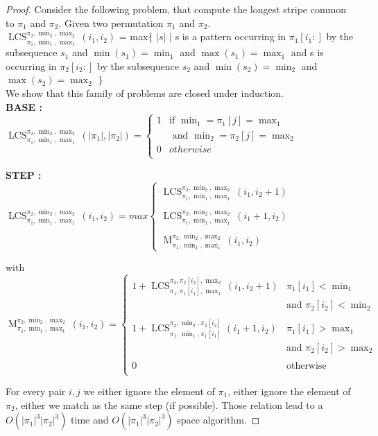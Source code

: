 \documentclass[a4paper]{llncs}
\DeclareMathOperator{\LCSa}{LCS}
\newcommand{\LCS}[8]{\LCSa_{{#1},{#2},{#3}}^{{#4},{#5},{#6}}({#7},{#8})}
\DeclareMathOperator{\matcha}{M}
\newcommand{\match}[8]{\matcha_{{#1},{#2},{#3}}^{{#4},{#5},{#6}}({#7},{#8})}
\begin{document}
\begin{proof}
Consider the following problem,
that compute the longest stripe common to $\pi_1$ and $\pi_2$.
Given two permutation $\pi_1$ and $\pi_2$.\\

$\LCS{\pi_1}{\min_1}{\max_1}{\pi_2}{\min_2}{\max_2}{i_1}{i_2}$
= max$\{$ $|s|$ $|$
s is a pattern occurring
in  $\pi_1[i_1:]$
by the subsequence $s_1$ and $\min(s_1)=\min_1$ and $\max(s_1)=\max_1$
and s is occurring
in  $\pi_2[i_2:]$
by the subsequence $s_2$ and $\min(s_2)=\min_2$ and $\max(s_2)=\max_2$
$\}$\\

We show that this family of problems are closed under induction.\\


\textbf{BASE :} \\
$
\LCS{\pi_1}{\min_1}{\max_1}{\pi_2}{\min_2}{\max_2}{|\pi_1|}{|\pi_2|} =
\begin{cases}
	1 & \text{if $\min_1=\pi_1[j]=\max_1$
	}\\
	& \text{ and $\min_2=\pi_2[j]=\max_2$}\\
	0 & otherwise\\
\end{cases}
$


\textbf{STEP :} \\

$
\LCS{\pi_1}{\min_1}{\max_1}{\pi_2}{\min_2}{\max_2}{i_1}{i_2}=max
\begin{cases}
	\LCS{\pi_1}{\min_1}{\max_1}{\pi_2}{\min_2}{\max_2}{i_1}{i_2+1} \\
	\\
	\LCS{\pi_1}{\min_1}{\max_1}{\pi_2}{\min_2}{\max_2}{i_1+1}{i_2} \\
	\\
	\match{\pi_1}{\min_1}{\max_1}{\pi_2}{\min_2}{\max_2}{i_1}{i_2}
\end{cases}
$

with \\
$
\match{\pi_1}{\min_1}{\max_1}{\pi_2}{\min_2}{\max_2}{i_1}{i_2}=
\begin{cases}
1+\LCS{\pi_1}{\pi_1[i_1]}{\max_1}{\pi_2}{\pi_2[i_2]}{\max_2}{i_1}{i_2+1}
	& \text{$\pi_1[i_1]<\min_1$ } \\
	& \text{and $\pi_2[i_2]<\min_2$} \\

&\\

1+\LCS{\pi_1}{\min_1}{\pi_1[i_1]}{\pi_2}{\min_2}{\pi_2[i_2]}{i_1+1}{i_2}
	& \text{$\pi_1[i_1]>\max_1$ } \\
	&\text{and $\pi_2[i_2]>\max_2$}\\

&\\

0 	& \text{otherwise}\\
\end{cases}
$


For every pair $i,j$ we either ignore the element of $\pi_1$,
either ignore the element of $\pi_2$,
either we match as the same step (if possible).
Those relation lead to a $O(|\pi_1|^3|\pi_2|^3)$ time and $O(|\pi_1|^3|\pi_2|^3)$ space algorithm.
\end{proof}
\end{document}
